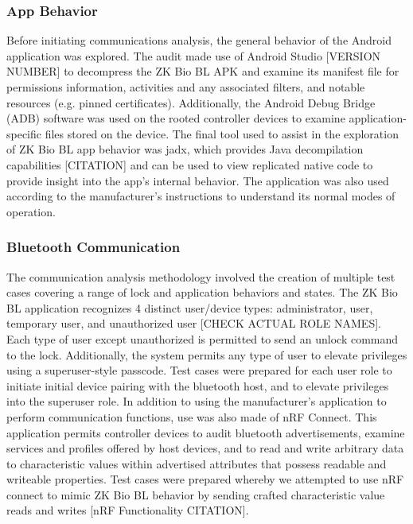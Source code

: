 \documentclass[journal]{IEEEtran}
\begin{document}
\bigskip %
\subsubsection{App Behavior}

Before initiating communications analysis, the general behavior of the Android application was explored.  The audit made use of Android Studio [VERSION NUMBER] to decompress the ZK Bio BL APK and examine its manifest file for permissions information, activities and any associated filters, and notable resources (e.g. pinned certificates).  Additionally, the Android Debug Bridge (ADB) software was used on the rooted controller devices to examine application-specific files stored on the device.  The final tool used to assist in the exploration of ZK Bio BL app behavior was jadx, which provides Java decompilation capabilities [CITATION] and can be used to view replicated native code to provide insight into the app's internal behavior.  The application was also used according to the manufacturer's instructions to understand its normal modes of operation.

\bigskip
\subsubsection{Bluetooth Communication}

The communication analysis methodology involved the creation of multiple test cases covering a range of lock and application behaviors and states.  The ZK Bio BL application recognizes 4 distinct user/device types: administrator, user, temporary user, and unauthorized user [CHECK ACTUAL ROLE NAMES].  Each type of user except unauthorized is permitted to send an unlock command to the lock.  Additionally, the system permits any type of user to elevate privileges using a superuser-style passcode.  Test cases were prepared for each user role to initiate initial device pairing with the bluetooth host, and to elevate privileges into the superuser role.  In addition to using the manufacturer's application to perform communication functions, use was also made of nRF Connect.  This application permits controller devices to audit bluetooth advertisements, examine services and profiles offered by host devices, and to read and write arbitrary data to characteristic values within advertised attributes that possess readable and writeable properties.  Test cases were prepared whereby we attempted to use nRF connect to mimic ZK Bio BL behavior by sending crafted characteristic value reads and writes [nRF Functionality CITATION].
\end{document}
